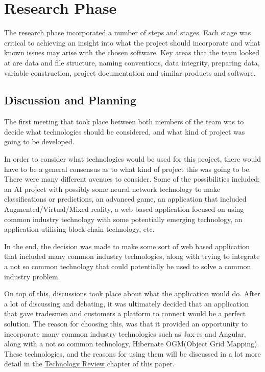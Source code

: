 \section{Research Phase}
\label{sec:MethodologyResearch}
The research phase incorporated a number of steps and stages. Each stage was critical to achieving an insight into what the project should incorporate and what known issues may arise with the chosen software. Key areas that the team looked at are data and file structure, naming conventions, data integrity, preparing data, variable construction, project documentation and similar products and software.
\subsection{Discussion and Planning}
The first meeting that took place between both members of the team was to decide what technologies should be considered, and what kind of project was going to be developed. 

\bigskip

In order to consider what technologies would be used for this project, there would have to be a general consensus as to what kind of project this was going to be. There were many different avenues to consider. Some of the possibilities included; an AI project with possibly some neural network technology to make classifications or predictions, an advanced game, an application that included Augmented/Virtual/Mixed reality, a web based application focused on using common industry technology with some potentially emerging technology, an application utilising block-chain technology, etc.

\bigskip

In the end, the decision was made to make some sort of web based application that included many common industry technologies, along with trying to integrate a not so common technology that could potentially be used to solve a common industry problem\cite{beeri1979computational}. 

On top of this, discussions took place about what the application would do. After a lot of discussing and debating, it was ultimately decided that an application that gave tradesmen and customers a platform to connect would be a perfect solution. The reason for choosing this, was that it provided an opportunity to incorporate many common industry technologies such as Jax-rs and Angular, along with a not so common technology, Hibernate OGM(Object Grid Mapping). These technologies, and the reasons for using them will be discussed in a lot more detail in the \hyperref[sec:TechnologyReview]{\underline{Technology Review}} chapter of this paper.

